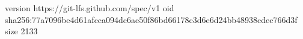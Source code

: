 version https://git-lfs.github.com/spec/v1
oid sha256:77a7096be4d61afcca094dc6ae50f86bd66178c3d6e6d24bb48938cdec766d3f
size 2133
